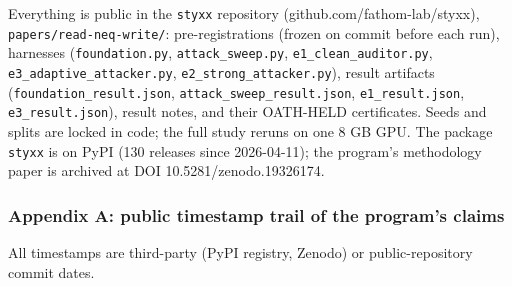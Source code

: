 \documentclass[
  11pt,
]{article}
\begin{document}
Everything is public in the \texttt{styxx} repository
(github.com/fathom-lab/styxx), \texttt{papers/read-neq-write/}:
pre-registrations (frozen on commit before each run), harnesses
(\texttt{foundation.py}, \texttt{attack\_sweep.py},
\texttt{e1\_clean\_auditor.py}, \texttt{e3\_adaptive\_attacker.py},
\texttt{e2\_strong\_attacker.py}), result artifacts
(\texttt{foundation\_result.json}, \texttt{attack\_sweep\_result.json},
\texttt{e1\_result.json}, \texttt{e3\_result.json}), result notes, and
their OATH-HELD certificates. Seeds and splits are locked in code; the
full study reruns on one 8 GB GPU. The package \texttt{styxx} is on PyPI
(130 releases since 2026-04-11); the program's methodology paper is
archived at DOI 10.5281/zenodo.19326174.

\subsubsection{Appendix A: public timestamp trail of the program's
claims}\label{appendix-a-public-timestamp-trail-of-the-programs-claims}

All timestamps are third-party (PyPI registry, Zenodo) or
public-repository commit dates.
\end{document}
